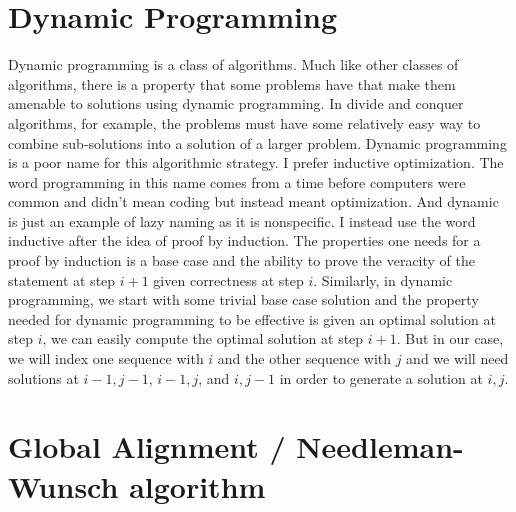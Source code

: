 \documentclass[11pt]{article}
\begin{document}
\section*{Dynamic Programming}
Dynamic programming is a class of algorithms. Much like other classes of algorithms, there is a property that some problems have that make them amenable to solutions using dynamic programming. In divide and conquer algorithms, for example, the problems must have some relatively easy way to combine sub-solutions into a solution of a larger problem. Dynamic programming is a poor name for this algorithmic strategy. I prefer inductive optimization. The word programming in this name comes from a time before computers were common and didn't mean coding but instead meant optimization. And dynamic is just an example of lazy naming as it is nonspecific. I instead use the word inductive after the idea of proof by induction. The properties one needs for a proof by induction is a base case and the ability to prove the veracity of the statement at step $i+1$ given correctness at step $i$. Similarly, in dynamic programming, we start with some trivial base case solution and the property needed for dynamic programming to be effective is given an optimal solution at step $i$, we can easily compute the optimal solution at step $i+1$. But in our case, we will index one sequence with $i$ and the other sequence with $j$ and we will need solutions at $i-1, j-1$, $i-1, j$, and $i, j-1$ in order to generate a solution at $i,j$.

\section*{Global Alignment / Needleman-Wunsch algorithm}

\end{document}

